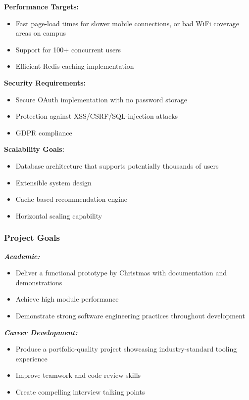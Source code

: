 \documentclass[12pt,a4paper]{article}
\begin{document}
\textbf{Performance Targets:}
\begin{itemize}
    \item Fast page-load times for slower mobile connections, or bad WiFi coverage areas on campus
    \item Support for 100+ concurrent users
    \item Efficient Redis caching implementation
\end{itemize}

\textbf{Security Requirements:}
\begin{itemize}
    \item Secure OAuth implementation with no password storage
    \item Protection against XSS/CSRF/SQL-injection attacks
    \item GDPR compliance
\end{itemize}

\textbf{Scalability Goals:}
\begin{itemize}
    \item Database architecture that supports potentially thousands of users
    \item Extensible system design
    \item Cache-based recommendation engine
    \item Horizontal scaling capability
\end{itemize}

\subsubsection{Project Goals}

\textbf{\textit{Academic:}}
\begin{itemize}
    \item Deliver a functional prototype by Christmas with documentation and demonstrations
    \item Achieve high module performance
    \item Demonstrate strong software engineering practices throughout development
\end{itemize}

\textbf{\textit{Career Development:}}
\begin{itemize}
    \item Produce a portfolio-quality project showcasing industry-standard tooling experience
    \item Improve teamwork and code review skills
    \item Create compelling interview talking points
\end{itemize}
\end{document}
